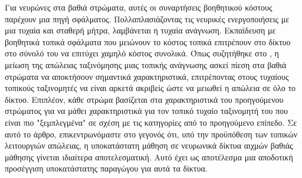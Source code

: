 \documentclass[12pt]{report}
\begin{document}
Για νευρώνες στα βαθιά στρώματα, αυτές οι συναρτήσεις βοηθητικού κόστους παρέχουν μια πηγή σφάλματος. Πολλαπλασιάζοντας τις νευρικές ενεργοποιήσεις με μια τυχαία και σταθερή μήτρα, λαμβάνεται η τυχαία ανάγνωση. Εκπαίδευση με βοηθητικά τοπικά σφάλματα που μειώνουν το κόστος τοπικά επιτρέπουν στο δίκτυο στο σύνολό του να επιτύχει χαμηλό κόστος συνολικά. Όπως συζητήθηκε στο \cite{mostafa2017}, η μείωση της απώλειας ταξινόμησης μιας τοπικής ανάγνωσης ασκεί πίεση στα βαθιά στρώματα να αποκτήσουν σημαντικά χαρακτηριστικά, επιτρέποντας στους τυχαίους τοπικούς ταξινομητές να είναι αρκετά ακριβείς ώστε να μειωθεί η απώλεια σε όλο το δίκτυο. Επιπλέον, κάθε στρώμα βασίζεται στα χαρακτηριστικά του προηγούμενου στρώματος για να μάθει χαρακτηριστικά για τον τοπικό τυχαίο ταξινομητή του που είναι πιο "ξεμπλεγμένα" σε σχέση με τις κατηγορίες από το προηγούμενο επίπεδο. Σε αυτό το άρθρο, επικεντρωνόμαστε στο γεγονός ότι, υπό την προϋπόθεση των τοπικών λειτουργιών απώλειας, η υποκατάστατη μάθηση σε νευρωνικά δίκτυα αιχμών βαθιάς μάθησης γίνεται ιδιαίτερα αποτελεσματική. Αυτό έχει ως αποτέλεσμα μια αποδοτική προσέγγιση υποκατάστατης παραγώγου για αυτά τα δίκτυα.
\end{document}
